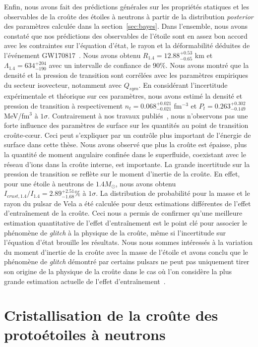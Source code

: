 Enfin, nous avons fait des prédictions générales sur les propriétés statiques 
et les observables de la croûte des étoiles à neutrons à partir de la 
distribution \textit{posterior} des paramètres calculée dans la 
section~\ref{sec:bayes}. Dans l'ensemble, nous avons constaté que nos 
prédictions des observables de l'étoile sont en assez bon accord avec les 
contraintes sur l'équation d'état, le rayon et la déformabilité déduites de 
l'événement GW170817~\cite{De2018,GW1}. Nous avons 
obtenu $R_{1.4}=12.88_{-0.65}^{+0.53}$ km et 
$\Lambda_{1.4} = 634_{-190}^{+204}$ avec un intervalle de confiance de $90\%$. 
%
Nous avons montré que la densité et la pression de transition sont 
corrélées avec les paramètres empiriques du secteur isovecteur, notamment avec 
$Q_{sym}$. En considérant l'incertitude expérimentale et théorique 
sur ces paramètres, nous avons estimé la densité et pression de transition
à respectivement $n_t=0.068_{-0.021}^{+0.021}$ fm$^{-3}$ et
$P_t=0.263_{-0.149}^{+0.302}$ MeV/fm$^3$ à $1\sigma$. Contrairement à nos 
travaux publiés~\cite{Carreau2019cc}, nous n'observons pas une forte influence
des paramètres de surface sur les quantités au point de transition 
croûte-c\oe ur. Ceci peut s'expliquer par un contrôle plus important de 
l'énergie de surface dans cette thèse. 
%
Nous avons observé que plus la croûte est épaisse, plus la quantité de moment 
angulaire confinée dans le superfluide, coexistant avec le réseau d'ions 
dans la croûte interne, est importante. 
La grande incertitude sur la pression de transition se reflète sur le moment 
d'inertie de la croûte. En effet, pour une étoile à neutrons de $1.4M_\odot$, 
nous avons obtenu $I_{crust,1.4}/I_{1.4}=2.89_{-1.68}^{+2.51} \%$ à $1\sigma$. 
La distribution de probabilité pour la masse et le rayon du pulsar de Vela a 
été calculée pour deux estimations différentes de l'effet d'entraînement de la 
croûte. 
Ceci nous a permis de confirmer qu'une meilleure estimation quantitative de
l'effet d'entraînement est le point clé pour associer le phénomène 
de \textit{glitch} à la physique de la croûte, même si l'incertitude sur 
l'équation d'état brouille les résultats. Nous nous sommes intéressés à la 
variation du moment d'inertie de la croûte avec la masse de l'étoile et avons 
conclu que le phénomène de \textit{glitch} démontré par certains pulsars ne 
peut pas uniquement tirer son origine de la physique de la croûte dans le cas 
où l'on considère la plus grande estimation actuelle de l'effet 
d'entraînement~\cite{Delsate2016}. 

\section{Cristallisation de la croûte des protoétoiles à neutrons}

